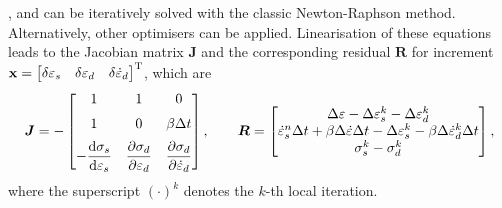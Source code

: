 ,  and  can be iteratively solved with the classic Newton-Raphson method. Alternatively, other optimisers can be applied. Linearisation of these equations leads to the Jacobian matrix $\mathbold{J}$ and the corresponding residual $\mathbold{R}$ for increment $\mathbf{x}=\begin{bmatrix}\delta\varepsilon_s&\delta\varepsilon_d&\delta\dot\varepsilon_d\end{bmatrix}^{\mathrm{T}}$, which are
\begin{gather}
\bm{J}=-\begin{bmatrix}
	1                                          & 1                               & 0                                   \\[2mm]
	1                                          & 0                               & \beta\Delta{}t                      \\[2mm]
	-\dfrac{\mathrm{d}\sigma_s}{\mathrm{d}\varepsilon_s} & \dfrac{\partial\sigma_d}{\partial\varepsilon_d} & \dfrac{\partial\sigma_d}{\partial\dot\varepsilon_d}
\end{bmatrix},\qquad
\bm{R}=\begin{bmatrix}
	\Delta\varepsilon-\Delta\varepsilon_s^k-\Delta\varepsilon_d^k                                                                  \\
	\dot\varepsilon^n_s\Delta{}t+\beta\Delta\dot\varepsilon\Delta{}t-\Delta\varepsilon_s^k-\beta\Delta\dot\varepsilon_d^k\Delta{}t \\
	\sigma^k_s-\sigma^k_d
\end{bmatrix},
\end{gather}
where the superscript $\left(\cdot\right)^k$ denotes the $k$-th local iteration.

